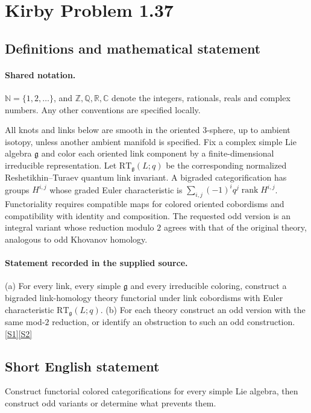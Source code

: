 \documentclass[11pt]{article}
\newcommand{\sref}[2]{\hyperlink{source:#1:#2}{[S#2]}}
\begin{document}
\section{Kirby Problem 1.37}\label{statement}

\subsection{Definitions and mathematical statement}

\paragraph{Shared notation.}$\mathbb N=\{1,2,\ldots\}$, and $\mathbb Z,\mathbb Q,\mathbb R,\mathbb C$ denote the integers, rationals, reals and complex numbers. Any other conventions are specified locally.


All knots and links below are smooth in the oriented $3$-sphere, up to ambient isotopy, unless another ambient manifold is specified. Fix a complex simple Lie algebra $\mathfrak g$ and color each oriented link component by a finite-dimensional irreducible representation. Let $\mathrm{RT}_{\mathfrak g}(L;q)$ be the corresponding normalized Reshetikhin--Turaev quantum link invariant. A bigraded categorification has groups $H^{i,j}$ whose graded Euler characteristic is $\sum_{i,j}(-1)^i q^j\operatorname{rank}H^{i,j}$. Functoriality requires compatible maps for colored oriented cobordisms and compatibility with identity and composition. The requested odd version is an integral variant whose reduction modulo $2$ agrees with that of the original theory, analogous to odd Khovanov homology.
\paragraph{Statement recorded in the supplied source.}
(a) For every link, every simple $\mathfrak g$ and every irreducible coloring, construct a bigraded link-homology theory functorial under link cobordisms with Euler characteristic $\mathrm{RT}_{\mathfrak g}(L;q)$. (b) For each theory construct an odd version with the same mod-$2$ reduction, or identify an obstruction to such an odd construction. \sref{statement}{1}\sref{statement}{2}
\subsection{Short English statement}
Construct functorial colored categorifications for every simple Lie algebra, then construct odd variants or determine what prevents them.
\end{document}
